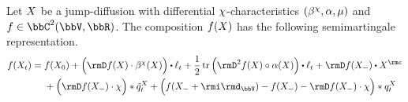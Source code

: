 \begin{lemma}
  \label{lemma:ito}
  Let $X$ be a jump-diffusion with differential $\chi$-characteristics $(\beta^\chi, \alpha, \mu)$ and $f \in \ccpathSpace{2}{\vecSpace}{\bbR}$.
  The composition $f(X)$ has the following semimartingale representation.
  \begin{equation*}
    f(\X_t)
    = \begin{aligned}[t]
      &f(\X_0) + \Big( \Der f(\X) \cdot \affDrift^\trunc(\X) \Big) \shortInt \leb_t + \frac12 \tr\Big( \Hess f(\X) \circ \affDiff(\X) \Big)  \shortInt \leb_t + \Der f(\X_-) \shortInt \X^\rmc \\
      &+ \Big( \Der f(\X_-) \cdot \trunc \Big) \ast \compensate{\jumpMeas^\X}_t + \Big( f(\X_-+\id_\vecSpace) - f(\X_-) - \Der f(\X_-) \cdot \trunc \Big) \ast \jumpMeas^\X_t
    \end{aligned}
  \end{equation*}
\end{lemma}
